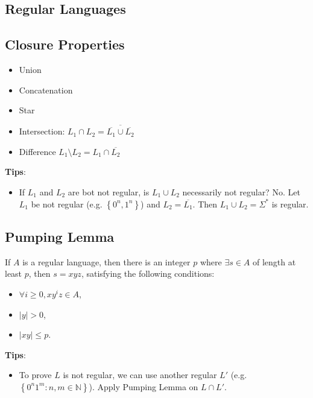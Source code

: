 \documentclass[10pt,landscape,a4paper]{article}
\newcommand{\N}{\mathbb{N}}
\newcommand{\set}[1]{\left \{ #1 \right \}}
\newcommand{\abs}[1]{\left | #1 \right |}
\begin{document}
\small

\begin{multicols*}{3}

\section{Regular Languages}

\subsection{Closure Properties}

\begin{itemize}
    \item Union
    \item Concatenation
    \item Star
    \item Intersection: $L_1 \cap L_2 = \overline{\overline{L_1} \cup \overline{L_2}}$
    \item Difference $L_1 \setminus L_2 = L_1 \cap \overline{L_2}$
\end{itemize}

\textbf{Tips}:

\begin{itemize}
    \item If $L_1$ and $L_2$ are bot not regular, is $L_1 \cup L_2$ necessarily not regular? No. Let $L_1$ be not regular (e.g. $\set{0^n, 1^n}$) and $L_2 = \overline{L_1}$. Then $L_1 \cup L_2 = \Sigma^*$ is regular.
\end{itemize}

\subsection{Pumping Lemma}

If $A$ is a regular language, then there is an integer $p$ where $\exists s \in A$ of length at least $p$, then $s = xyz$, satisfying the following conditions:

\begin{itemize}
    \item $\forall i \geq 0, xy^iz \in A$,
    \item $\abs{y} > 0$,
    \item $\abs{xy} \leq p$.
\end{itemize}

\textbf{Tips}:

\begin{itemize}
    \item To prove $L$ is not regular, we can use another regular $L'$ (e.g. $\set{0^n1^m: n, m \in \N}$). Apply Pumping Lemma on $L \cap L'$.
\end{itemize}


\end{multicols*}
\end{document}
